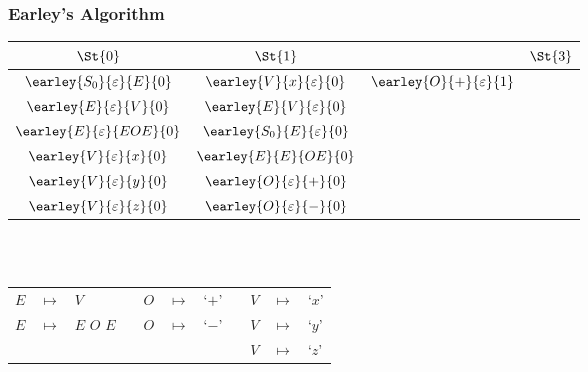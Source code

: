 \begin{frame}
	\frametitle{Earley's Algorithm}
	\centering
	\begin{tabular}{|c|c|c|c|}
		\hline
		$\St{0}$                          & $\St{1}$                          &\St{2} & $\St{3}$ \\
		\hline
		$\earley{S_0}{\varepsilon}{E}{0}$ & $\earley{V}{x}{\varepsilon}{0}$   & $\earley{O}{+}{\varepsilon}{1}$ & \\
		$\earley{E}{\varepsilon}{V}{0}$   & $\earley{E}{V}{\varepsilon}{0}$   & & \\
		$\earley{E}{\varepsilon}{EOE}{0}$ & $\earley{S_0}{E}{\varepsilon}{0}$ & & \\
		$\earley{V}{\varepsilon}{x}{0}$   & $\earley{E}{E}{OE}{0}$            & & \\
		$\earley{V}{\varepsilon}{y}{0}$   & $\earley{O}{\varepsilon}{+}{0}$   & & \\
		$\earley{V}{\varepsilon}{z}{0}$   & $\earley{O}{\varepsilon}{-}{0}$   & & \\
		\hline
	\end{tabular}

	\\~\\
	\vspace{0.5cm}
	\scriptsize
	\begin{tabular}{rclcrclcrcl}
		$E$ & $ \mapsto $ & $V$         && $O$ & $ \mapsto $ & `$+$' && $V$ & $ \mapsto $ & `$x$' \\
		$E$ & $ \mapsto $ & $E$ $O$ $E$ && $O$ & $ \mapsto $ & `$-$' && $V$ & $ \mapsto $ & `$y$' \\
		    &             &             &&     &             &       && $V$ & $ \mapsto $ & `$z$'
	\end{tabular}
\end{frame}

